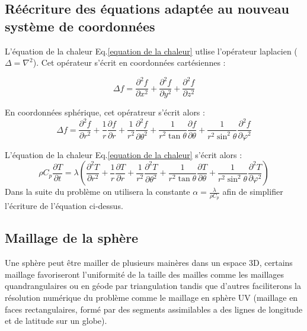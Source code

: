 \documentclass[fleqn]{article}
\begin{document}
\subsection{Réécriture des équations adaptée au nouveau système de coordonnées}
 
L'équation de la chaleur Eq.\eqref{equation de la chaleur} utlise l'opérateur laplacien ($\Delta = \nabla^2$). Cet opérateur s'écrit en coordonnées cartésiennes :

\begin{equation}
    \Delta f = {\frac {\partial ^{2}f }{\partial x^{2}}}+{\frac {\partial ^{2}f }{\partial y^{2}}}+{\frac {\partial ^{2}f }{\partial z^{2}}}
\end{equation}

En coordonnées sphérique, cet opératreur s'écrit alors :
\begin{equation}
     \Delta f={\frac {\partial ^{2}f}{\partial r^{2}}}+{\frac {1}{r}}{\frac {\partial f}{\partial r}}+{\frac {1}{r^{2}}}{\frac {\partial ^{2}f}{\partial \theta ^{2}}}+{\frac {1}{r^{2}\tan \theta }}{\frac {\partial f}{\partial \theta }}+{\frac {1}{r^{2}\sin ^{2}\theta }}{\frac {\partial ^{2}f}{\partial \varphi ^{2}}}
\end{equation}

L'équation de la chaleur Eq.\eqref{equation de la chaleur} s'écrit alors :
\begin{equation}
    \rho C_p \frac{ \partial T}{\partial t}  = \lambda \left( 
    {\frac {\partial ^{2}T}{\partial r^{2}}}+{\frac {1}{r}}{\frac {\partial T}{\partial r}}+{\frac {1}{r^{2}}}{\frac {\partial ^{2}T}{\partial \theta ^{2}}}+{\frac {1}{r^{2}\tan \theta }}{\frac {\partial T}{\partial \theta }}+{\frac {1}{r^{2}\sin ^{2}\theta }}{\frac {\partial ^{2}T}{\partial \varphi ^{2}}} \right)      
\end{equation}
Dans la suite du problème on utilisera la constante $\alpha = \frac{\lambda}{\rho C_p}$ afin de simplifier l'écriture de l'équation ci-dessus.

\subsection{Maillage de la sphère}
Une sphère peut être mailler de plusieurs mainères dans un espace 3D, certains maillage favoriseront l'uniformité de la taille des mailles comme les maillages quandrangulaires ou en géode par triangulation tandis que d'autres faciliterons la résolution numérique du problème comme le maillage en sphère UV (maillage en faces rectangulaires, formé par des segments assimilables a des lignes de longitude et de latitude sur un globe).
\end{document}
